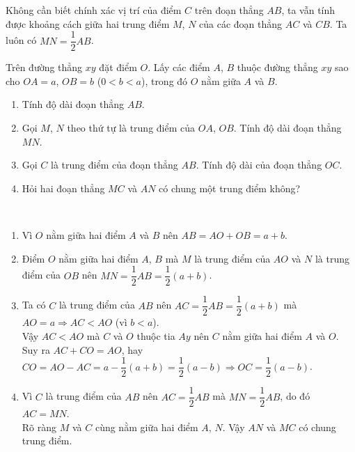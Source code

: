 \begin{luuy}{}
	Không cần biết chính xác vị trí của điểm $C$ trên đoạn thẳng $AB$, ta vẫn tính được khoảng cách giữa hai trung điểm $M$, $N$ của các đoạn thẳng $AC$ và $CB$. Ta luôn có $MN=\dfrac{1}{2}AB$.
\end{luuy}

\begin{vd}%
	Trên đường thẳng $xy$ đặt điểm $O$. Lấy các điểm $A$, $B$ thuộc đường thẳng $xy$ sao cho $OA=a$, $OB=b$ ($0<b<a$), trong đó $O$ nằm giữa $A$ và $B$.
	\begin{enumerate}
		\item Tính độ dài đoạn thẳng $AB$.
		\item Gọi $M$, $N$ theo thứ tự là trung điểm của $OA$, $OB$. Tính độ dài đoạn thẳng $MN$.
		\item Gọi $C$ là trung điểm của đoạn thẳng $AB$. Tính độ dài của đoạn thẳng $OC$.
		\item Hỏi hai đoạn thẳng $MC$ và $AN$ có chung một trung điểm không?
	\end{enumerate}
	\loigiai
	{\\
		\begin{enumerate}
			\item Vì $O$ nằm giữa hai điểm $A$ và $B$ nên $AB=AO+OB=a+b$.
			\item Điểm $O$ nằm giữa hai điểm $A$, $B$ mà $M$ là trung điểm của $AO$ và $N$ là trung điểm của $OB$ nên $MN=\dfrac{1}{2}AB=\dfrac{1}{2}\left(a+b\right)$.
			\item Ta có $C$ là trung điểm của $AB$ nên $AC=\dfrac{1}{2}AB=\dfrac{1}{2}\left(a+b\right)$ mà $AO=a\Rightarrow AC<AO$ (vì $b<a$).\\
			Vậy $AC<AO$ mà $C$ và $O$ thuộc tia $Ay$ nên $C$ nằm giữa hai điểm $A$ và $O$.\\
			Suy ra $AC+CO=AO$, hay $CO=AO-AC=a-\dfrac{1}{2}\left(a+b\right)=\dfrac{1}{2}\left(a-b\right)\Rightarrow OC=\dfrac{1}{2}\left(a-b\right)$.
			\item Vì $C$ là trung điểm của $AB$ nên $AC=\dfrac{1}{2}AB$ mà $MN=\dfrac{1}{2}AB$, do đó $AC=MN$.\\
			Rõ ràng $M$ và $C$ cùng nằm giữa hai điểm $A$, $N$. Vậy $AN$ và $MC$ có chung trung điểm.
	\end{enumerate}}
\end{vd}

